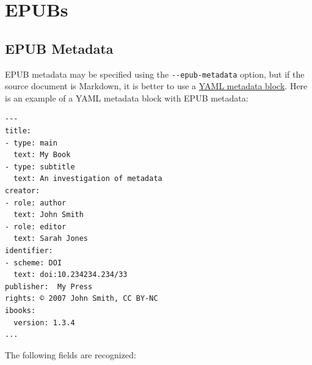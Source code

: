 \documentclass[
  b5paper
]{book}
\begin{document}
\chapter{EPUBs}\label{epubs}

\section{EPUB Metadata}\label{epub-metadata}

EPUB metadata may be specified using the \texttt{-\/-epub-metadata}
option, but if the source document is Markdown, it is better to use a
\hyperref[extension-yaml_metadata_block]{YAML metadata block}. Here is
an example of a YAML metadata block with EPUB metadata:

\begin{verbatim}
---
title:
- type: main
  text: My Book
- type: subtitle
  text: An investigation of metadata
creator:
- role: author
  text: John Smith
- role: editor
  text: Sarah Jones
identifier:
- scheme: DOI
  text: doi:10.234234.234/33
publisher:  My Press
rights: © 2007 John Smith, CC BY-NC
ibooks:
  version: 1.3.4
...
\end{verbatim}

The following fields are recognized:
\end{document}
